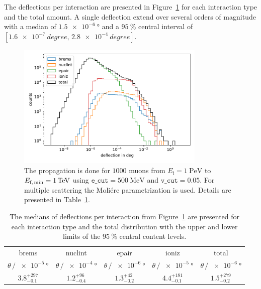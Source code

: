 The deflections per interaction are presented in Figure~\ref{fig:defl_per_int} 
for each interaction type and the total amount. A single deflection 
extend over several orders of magnitude with a median of $\SI{1.5e-6}{\degree}$
and a $\SI{95}{\percent}$ central interval of $[\SI{1.6e-7}{degree}, \,\SI{2.8e-4}{degree}]$.

\begin{figure}
    \centering 
    \includegraphics[width=0.8\textwidth]{figures/1PeV_1TeV_1000events.pdf}
    \caption{The propagation is done for $\num{1000}$ 
    muons from $E_{\text{i}} = \SI{1}{\peta\electronvolt}$ to $E_{\text{f,\,min}} = \SI{1}{\tera\electronvolt}$ using $\texttt{e\_cut} = \SI{500}{\mega\electronvolt}$ and $\texttt{v\_cut} = 0.05$. For multiple scattering 
    the Moliére parametrization is used. Details are presented in 
    Table~\ref{tab:defl_per_int}.}
    \label{fig:defl_per_int}
\end{figure}

\begin{table}
    \centering 
    \caption{The medians of deflections per interaction from Figure~\ref{fig:defl_per_int} are presented for each interaction type and the total distribution with the upper and lower limits of the $\SI{95}{\percent}$ 
    central content levels.}
    \begin{tabular}{ccccc}
        \toprule 
        brems & nuclint & epair & ioniz & total \\
        $\theta\,/\,\SI{e-5}{\degree}$ & $\theta\,/\,\SI{e-4}{\degree}$ & $\theta\,/\,\SI{e-6}{\degree}$ & $\theta\,/\,\SI{e-5}{\degree}$ & $\theta\,/\,\SI{e-6}{\degree}$\\
        \midrule 
        $3.8_{-0.1}^{+297}$ & $1.2_{-0.4}^{+96}$ & $1.3_{-0.2}^{+42}$ & $4.4_{-0.1}^{+181}$& $1.5_{-0.2}^{+279}$\\ 
        \bottomrule
    \end{tabular}
    \label{tab:defl_per_int}
\end{table}